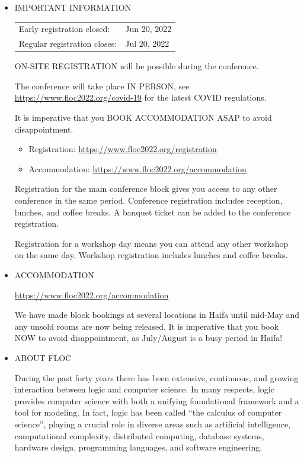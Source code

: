 \documentclass[prodmode,acmtecs]{acmsmall} %
\begin{document}
\begin{itemize}\item  IMPORTANT INFORMATION 
 
\begin{tabulary}{\linewidth}{LL}Early registration closed:  & Jun 20, 2022 \\
Regular registration closes:  & Jul 20, 2022 \\
\end{tabulary}
 
  ON-SITE REGISTRATION will be possible during the conference. 
 
  The conference will take place IN PERSON, see \href{https://www.floc2022.org/covid-19}{https://www.floc2022.org/covid-19} for the latest COVID regulations. 
 
  It is imperative that you BOOK ACCOMMODATION ASAP to avoid disappointment. 
 
\begin{itemize}\item  Registration: \href{https://www.floc2022.org/registration}{https://www.floc2022.org/registration}
\item  Accommodation: \href{https://www.floc2022.org/accommodation}{https://www.floc2022.org/accommodation}
\end{itemize} 
  Registration for the main conference block gives you access to any other conference in the same period. Conference registration includes reception, lunches, and coffee breaks. A banquet ticket can be added to the conference registration. 
 
  Registration for a workshop day means you can attend any other workshop on the same day. Workshop registration includes lunches and coffee breaks. 
 
\item  ACCOMMODATION 
 
  \href{https://www.floc2022.org/accommodation}{https://www.floc2022.org/accommodation} 
 
  We have made block bookings at several locations in Haifa until mid-May and any unsold rooms are now being released. It is imperative that you book NOW to avoid disappointment, as July/August is a busy period in Haifa! 
 
\item  ABOUT FLOC 
 
  During the past forty years there has been extensive, continuous, and growing interaction between logic and computer science. In many respects, logic provides computer science with both a unifying foundational framework and a tool for modeling. In fact, logic has been called “the calculus of computer science”, playing a crucial role in diverse areas such as artificial intelligence, computational complexity, distributed computing, database systems, hardware design, programming languages, and software engineering. 
 

\end{itemize}
\end{document}
